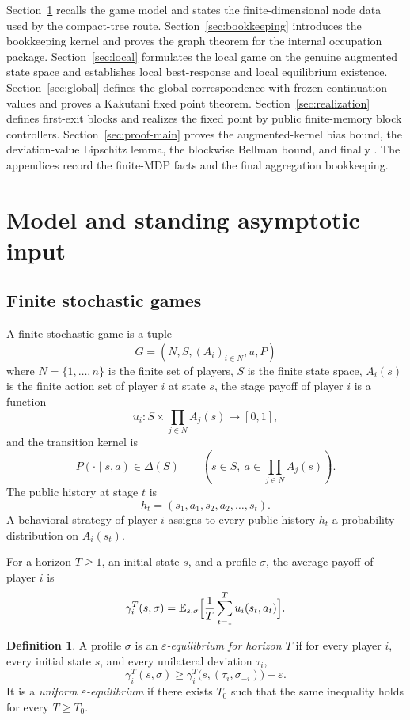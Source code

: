 \documentclass[12pt]{article}
\theoremstyle{definition}
\newtheorem{definition}[theorem]{Definition}
\newcommand{\eps}{\varepsilon}
\newcommand{\E}{\mathbb{E}}
\newcommand{\1}{\mathbf{1}}
\begin{document}
Section~\ref{sec:model} recalls the game model and states the finite-dimensional
node data used by the compact-tree route. Section~\ref{sec:bookkeeping}
introduces the bookkeeping kernel and proves the graph theorem for the internal
occupation package. Section~\ref{sec:local} formulates the local game on the
genuine augmented state space and establishes local best-response and local
equilibrium existence. Section~\ref{sec:global} defines the global correspondence
with frozen continuation values and proves a Kakutani fixed point theorem.
Section~\ref{sec:realization} defines first-exit blocks and realizes the fixed
point by public finite-memory block controllers. Section~\ref{sec:proof-main}
proves the augmented-kernel bias bound, the deviation-value Lipschitz lemma, the
blockwise Bellman bound, and finally . The appendices record the
finite-MDP facts and the final aggregation bookkeeping.

\section{Model and standing asymptotic input}
\label{sec:model}

\subsection{Finite stochastic games}

A finite stochastic game is a tuple
\[
G=(N,S,(A_i)_{i\in N},u,P)
\]
where $N=\{1,\dots,n\}$ is the finite set of players, $S$ is the finite state
space, $A_i(s)$ is the finite action set of player $i$ at state $s$, the stage
payoff of player $i$ is a function
\[
u_i:S\times \prod_{j\in N}A_j(s)\to [0,1],
\]
and the transition kernel is
\[
P(\cdot\mid s,a)\in \Delta(S)
\qquad (s\in S,\ a\in \prod_{j\in N}A_j(s)).
\]
The public history at stage $t$ is
\[
h_t=(s_1,a_1,s_2,a_2,\dots,s_t).
\]
A behavioral strategy of player $i$ assigns to every public history $h_t$ a
probability distribution on $A_i(s_t)$.

For a horizon $T\ge 1$, an initial state $s$, and a profile $\sigma$, the average
payoff of player $i$ is
\[
\gamma_i^T(s,\sigma)
=
\E_{s,\sigma}\Bigl[\frac1T\sum_{t=1}^T u_i(s_t,a_t)\Bigr].
\]

\begin{definition}
A profile $\sigma$ is an \emph{$\eps$-equilibrium for horizon $T$} if for every
player $i$, every initial state $s$, and every unilateral deviation $\tau_i$,
\[
\gamma_i^T(s,\sigma)
\ge
\gamma_i^T\bigl(s,(\tau_i,\sigma_{-i})\bigr)-\eps.
\]
It is a \emph{uniform $\eps$-equilibrium} if there exists $T_0$ such that the same
inequality holds for every $T\ge T_0$.
\end{definition}
\end{document}
